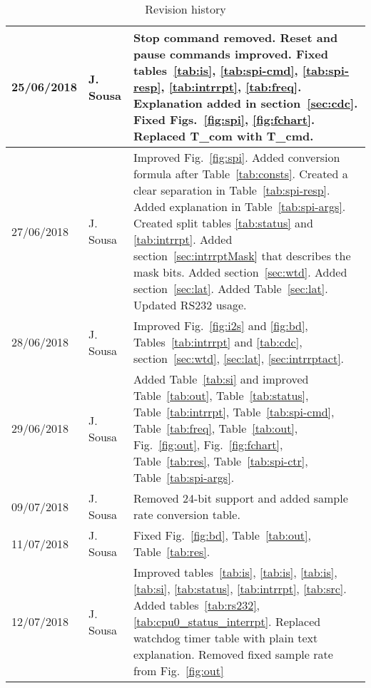 \documentclass{rep}
\theoremstyle{plain}
\begin{document}
\begin{table}[H]
\begin{center}
\begin{tabular}{|l|l|p{8cm}|}
      25/06/2018 & J. Sousa & Stop command removed. Reset and pause commands
      improved.  Fixed tables~\ref{tab:is}, \ref{tab:spi-cmd},
      \ref{tab:spi-resp}, \ref{tab:intrrpt}, \ref{tab:freq}.  Explanation added
      in section~\ref{sec:cdc}. Fixed Figs.~\ref{fig:spi},
      \ref{fig:fchart}. Replaced T\_com with T\_cmd.\\ \hline

      \rowcolor{iob-blue} 27/06/2018 & J. Sousa & Improved
      Fig.~\ref{fig:spi}. Added conversion formula after
      Table~\ref{tab:consts}. Created a clear separation in
      Table~\ref{tab:spi-resp}. Added explanation in Table~\ref{tab:spi-args}.
      Created split tables \ref{tab:status} and \ref{tab:intrrpt}. Added
      section~\ref{sec:intrrptMask} that describes the mask bits. Added
      section~\ref{sec:wtd}. Added section~\ref{sec:lat}. Added
      Table~\ref{sec:lat}. Updated RS232 usage.\\ \hline

      28/06/2018 & J. Sousa & Improved Fig.~\ref{fig:i2s} and \ref{fig:bd},
      Tables~\ref{tab:intrrpt} and \ref{tab:cdc}, section~\ref{sec:wtd},
      \ref{sec:lat}, \ref{sec:intrrptact}. \\ \hline

      \rowcolor{iob-blue} 29/06/2018 & J. Sousa & Added Table~\ref{tab:si} and improved
      Table~\ref{tab:out}, Table~\ref{tab:status}, Table~\ref{tab:intrrpt},
      Table~\ref{tab:spi-cmd}, Table~\ref{tab:freq}, Table~\ref{tab:out},
      Fig.~\ref{fig:out}, Fig.~\ref{fig:fchart}, Table~\ref{tab:res},
      Table~\ref{tab:spi-ctr}, Table~\ref{tab:spi-args}.\\ \hline

      09/07/2018 & J. Sousa & Removed 24-bit support and added sample
      rate conversion table.\\ \hline

      \rowcolor{iob-blue} 11/07/2018 & J. Sousa & Fixed Fig.~\ref{fig:bd},
      Table~\ref{tab:out}, Table~\ref{tab:res}.\\ \hline

      12/07/2018 & J. Sousa & Improved
      tables~\ref{tab:is}, \ref{tab:is}, \ref{tab:is}, \ref{tab:si},
      \ref{tab:status}, \ref{tab:intrrpt}, \ref{tab:src}.  Added
      tables~\ref{tab:rs232},\ref{tab:cpu0_status_interrpt}. Replaced
      watchdog timer table with plain text explanation. Removed fixed
      sample rate from Fig.~\ref{fig:out}\\ \hline
      
    \end{tabular}
    \caption{Revision history}
  \end{center}
\end{table}
\clearpage
\end{document}

